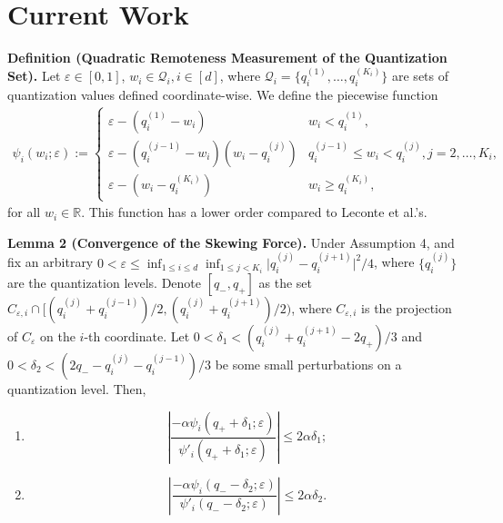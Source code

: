 \documentclass[10pt,a4paper]{article}
\begin{document}
\newpage
\section{Current Work} 


\textbf{Definition (Quadratic Remoteness Measurement of the Quantization Set).} Let $\varepsilon\in[0,1]$, $w_i\in \mathcal{Q}_i, i\in [d]$,
where $\mathcal{Q}_i=\{q^{(1)}_i, \ldots, q^{(K_i)}_i\}$ are sets of quantization values defined coordinate-wise. We define the piecewise function
\begin{align*}\psi_{i}(w_i;\varepsilon):=\begin{cases}\varepsilon-(q_i^{(1)}-w_i)                  & w_i < q_i^{(1)},                                  \\
             \varepsilon-(q_i^{(j-1)}-w_i)(w_i-q_i^{(j)}) & q_i^{(j-1)}\leq w_i < q_i^{(j)}, j=2,\ldots, K_i, \\
             \varepsilon-(w_i-q_i^{(K_i)})                & w_i \geq q_i^{(K_i)},\end{cases}
\end{align*} for all $w_i\in\mathbb{R}$. This function has a lower order compared to Leconte et al.'s.


\textbf{Lemma 2 (Convergence of the Skewing Force).} Under Assumption 4, and fix an arbitrary $0<\varepsilon\leq \inf_{1\leq i\leq d}\inf_{1\leq j<K_i} \lvert q_i^{(j)} - q_{i}^{(j+1)}\rvert^2/4$, where $\{q_i^{(j)}\}$ are the quantization levels. Denote $[q_-, q_+]$ as the set $C_{\varepsilon,i}\cap [(q_i^{(j)}+q_i^{(j-1)})/2, (q_i^{(j)}+q_i^{(j+1)})/2)$, where $C_{\varepsilon,i}$ is the projection of $C_\varepsilon$ on the $i$-th coordinate.
Let $0<\delta_1<(q_i^{(j)}+q_i^{(j+1)}-2q_+)/3$ and $0<\delta_2<(2q_--q_i^{(j)}-q_i^{(j-1)})/3$ be some small perturbations on a quantization level.  Then,
\begin{enumerate}[label=(\alph*)]
  \item \[\left\lvert \frac{-\alpha\psi_i(q_++\delta_1;\varepsilon)}{\psi'_i(q_++\delta_1;\varepsilon)}\right\rvert \leq 2\alpha \delta_1;\]
  \item \[\left\lvert \frac{-\alpha\psi_i(q_--\delta_2;\varepsilon)}{\psi'_i(q_--\delta_2;\varepsilon)}\right\rvert \leq 2\alpha\delta_2.\]
\end{enumerate}
\end{document}
